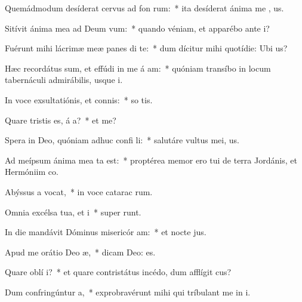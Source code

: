 \item Quemádmodum desíderat cervus ad fon rum:~* ita desíderat ánima me  , us.
\item Sitívit ánima mea ad Deum  vum:~* quando véniam, et apparébo ante  i?
\item Fuérunt mihi lácrimæ meæ panes di  te:~* dum dícitur mihi quotídie: Ubi   us?
\item Hæc recordátus sum, et effúdi in me á am:~* quóniam transíbo in locum tabernáculi admirábilis, usque   i.
\item In voce exsultatiónis, et connis:~* so tis.
\item Quare tristis es, á a?~* et   me?
\item Spera in Deo, quóniam adhuc confi li:~* salutáre vultus mei,   us.
\item Ad meípsum ánima mea ta est:~* proptérea memor ero tui de terra Jordánis, et Hermóniim   co.
\item Abýssus a vocat,~* in voce catarac rum.
\item Omnia excélsa tua, et  i~* super  runt.
\item In die mandávit Dóminus misericór am:~* et nocte  jus.
\item Apud me orátio Deo  æ,~* dicam Deo:   es.
\item Quare oblí  i?~* et quare contristátus incédo, dum afflígit  cus?
\item Dum confringúntur  a,~* exprobravérunt mihi qui tríbulant me in i.
